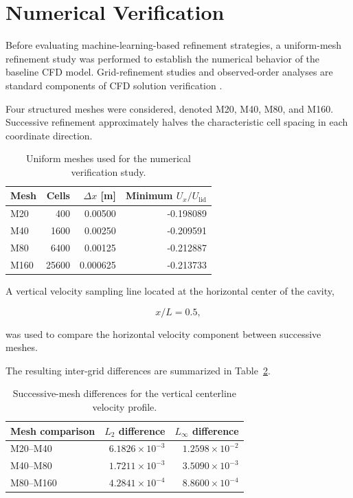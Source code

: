 \section{Numerical Verification}
\label{sec:verification}

Before evaluating machine-learning-based refinement strategies, a uniform-mesh
refinement study was performed to establish the numerical behavior of the
baseline CFD model. Grid-refinement studies and observed-order analyses are
standard components of CFD solution verification
\cite{roache1998,celik2008}.

Four structured meshes were considered, denoted M20, M40, M80, and M160.
Successive refinement approximately halves the characteristic cell spacing
in each coordinate direction.

\begin{table}[htbp]
\centering
\caption{Uniform meshes used for the numerical verification study.}
\label{tab:uniform_meshes}
\begin{tabular}{lrrr}
\toprule
Mesh & Cells & $\Delta x$ [m] & Minimum $U_x/U_{\mathrm{lid}}$ \\
\midrule
M20  & 400    & 0.00500 & -0.198089 \\
M40  & 1600   & 0.00250 & -0.209591 \\
M80  & 6400   & 0.00125 & -0.212887 \\
M160 & 25600  & 0.000625 & -0.213733 \\
\bottomrule
\end{tabular}
\end{table}

A vertical velocity sampling line located at the horizontal center of the
cavity,

\begin{equation}
x/L = 0.5,
\end{equation}

was used to compare the horizontal velocity component between successive
meshes.

The resulting inter-grid differences are summarized in
Table~\ref{tab:grid_convergence}.

\begin{table}[htbp]
\centering
\caption{Successive-mesh differences for the vertical centerline velocity
profile.}
\label{tab:grid_convergence}
\begin{tabular}{lrr}
\toprule
Mesh comparison & $L_2$ difference & $L_\infty$ difference \\
\midrule
M20--M40   & $6.1826\times10^{-3}$ & $1.2598\times10^{-2}$ \\
M40--M80   & $1.7211\times10^{-3}$ & $3.5090\times10^{-3}$ \\
M80--M160  & $4.2841\times10^{-4}$ & $8.8600\times10^{-4}$ \\
\bottomrule
\end{tabular}
\end{table}

